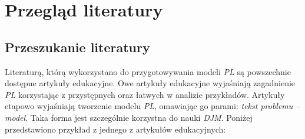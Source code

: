 
\chapter{Przegląd literatury}\label{ch:review}





\section{Przeszukanie literatury}

Literaturą, którą wykorzystano do przygotowywania modeli \textit{PL} są powszechnie dostępne artykuły edukacyjne. Owe artykuły edukacyjne wyjaśniają zagadnienie \textit{PL} korzystając z przystępnych oraz łatwych w analizie przykładów. Artykuły etapowo wyjaśniają tworzenie modelu \textit{PL}, omawiając go parami: \textit{tekst problemu -- model}. Taka forma jest szczególnie korzystna do nauki \textit{DJM}. Poniżej przedstawiono przykład z jednego z artykułów edukacyjnych\cite{cimt}:

